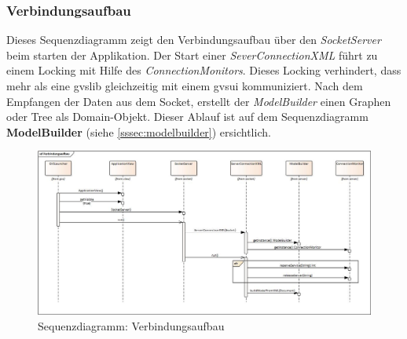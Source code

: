 \documentclass[11pt,a4paper,english,oneside]{book}
\numberwithin{equation}{chapter}
\begin{document}
	\subsubsection{Verbindungsaufbau}
	Dieses Sequenzdiagramm zeigt den Verbindungsaufbau über den \textit{SocketServer} beim starten der Applikation. Der Start einer \textit{SeverConnectionXML} führt zu einem Locking mit Hilfe des \textit{ConnectionMonitors}. Dieses Locking verhindert, dass mehr als eine \gls{gvslib} gleichzeitig mit einem \gls{gvsui} kommuniziert. Nach dem Empfangen der Daten aus dem Socket, erstellt der \textit{ModelBuilder} einen Graphen oder Tree als Domain-Objekt. Dieser Ablauf ist auf dem Sequenzdiagramm \textbf{ModelBuilder} (siehe \ref{sssec:modelbuilder}) ersichtlich.
	\begin{figure}[h!]
		\centering
		\includegraphics[width=\linewidth]{assets/images/verbindungsaufbau}
		\caption{Sequenzdiagramm: Verbindungsaufbau}
		\label{fig:sd-verbindungsaufbau}
	\end{figure}
\end{document}
